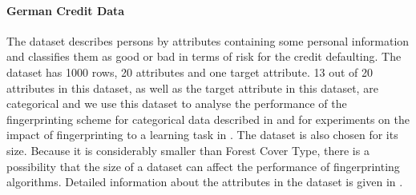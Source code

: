 \begin{table}[ht]
\centering
\caption{Attributes of the Forest Cover Type dataset}
\label{table:forest-attr}
\end{table}

\paragraph{German Credit Data}
The dataset describes persons by attributes containing some personal information and classifies them as good or bad in terms of risk for the credit defaulting. 
The dataset has 1000 rows, 20 attributes and one target attribute.
13 out of 20 attributes in this dataset, as well as the target attribute in this dataset,  are categorical and we use this dataset to analyse the performance of the fingerprinting scheme for categorical data described in  and for experiments on the impact of fingerprinting to a learning task in . 
The dataset is also chosen for its size. 
Because it is considerably smaller than Forest Cover Type, there is a possibility that the size of a dataset can affect the performance of fingerprinting algorithms.
Detailed information about the attributes in the dataset is given in .

